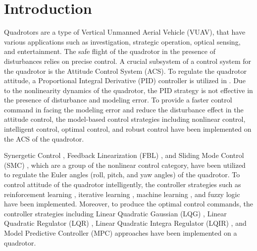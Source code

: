 \documentclass[3p]{elsarticle}
\begin{document}
\section{Introduction}\label{sec:intro}
\noindent Quadrotors are a type of Vertical Unmanned Aerial Vehicle (VUAV), that have various applications such as investigation, strategic operation, optical sensing, and entertainment.
The safe flight of the quadrotor in the presence of disturbances relies on precise control. 
A crucial subsystem of a control system for the quadrotor is the Attitude Control System (ACS). 
To regulate the quadrotor attitude, a Proportional Integral Derivative (PID) controller is utilized in \cite{article_Abdul, article_Bolandi}. Due to the nonlinearity dynamics of the quadrotor, the PID strategy is not effective in the presence of disturbance and modeling error.
To provide a faster control command in facing the modeling error and reduce the disturbance effect in the attitude control, the model-based control strategies including nonlinear control, intelligent control, optimal control, and robust control have been implemented on the ACS of the quadrotor.

Synergetic Control \cite{article_Chara}, Feedback Linearization (FBL) \cite{article_Aboudonia}, and Sliding Mode Control (SMC) \cite{7007285}, which are a group of the nonlinear control category, have been utilized to regulate the Euler angles (roll, pitch, and yaw angles) of the quadrotor. To control attitude of the quadrotor intelligently, the controller strategies such as reinforcement learning \cite{LIN2020135}, iterative learning \cite{electronics10202474}, machine learning \cite{4564736}, and fuzzy logic \cite{KIM20211888} have been implemented. Moreover, to produce the optimal control commands, the controller strategies including Linear Quadratic Gaussian (LQG) \cite{7367782}, Linear Quadratic Regulator (LQR) \cite{7064553_LQR}, Linear Quadratic Integra Regulator (LQIR) \cite{article_LQIR}, and Model Predictive Controller (MPC) approaches \cite{XUE20227992} have been implemented on a quadrotor.
\end{document}
